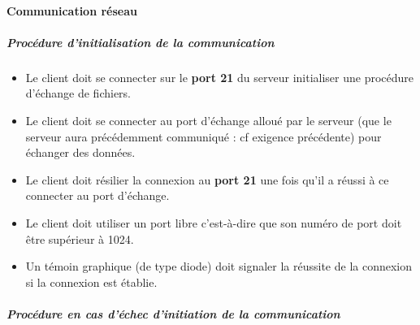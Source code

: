\documentclass[10pt,a4paper]{report}
\begin{document}
\paragraph{Communication réseau}

	\subparagraph{Procédure d'initialisation de la communication}

		\begin{itemize}[label = $\triangleright$]

			\item Le client doit se connecter sur le \textbf{port 21} du serveur initialiser une procédure d'échange de fichiers.

			\item Le client doit se connecter au port d'échange alloué par le serveur (que le serveur aura précédemment communiqué : cf exigence précédente) pour échanger des données.

			\item Le client doit résilier la connexion au \textbf{port 21} une fois qu'il a réussi à ce connecter au port d'échange.

			\item Le client doit utiliser un port libre c'est-à-dire que son numéro de port doit être supérieur à 1024.

			\item Un témoin graphique (de type diode) doit signaler la réussite de la connexion si la connexion est établie. 
			\end{itemize}

	\subparagraph{Procédure en cas d'échec d'initiation de la communication }
\end{document}
